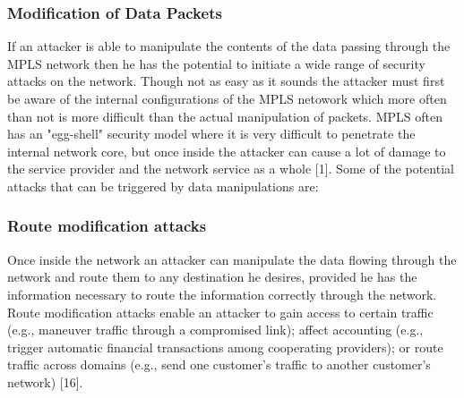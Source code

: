 \subsubsection{Modification of Data Packets}
If an attacker is able to manipulate the contents of the data passing through the MPLS network then he has the potential to initiate a wide range of security attacks on the network. Though not as easy as it sounds the attacker must first be aware of the internal configurations of the MPLS netowork which more often than not is more difficult than the actual manipulation of packets. MPLS often has an "egg-shell" security model where it is very difficult to penetrate the internal network core, but once inside the attacker can cause a lot of damage to the service provider and the network service as a whole [1]. Some of the potential attacks that can be triggered by data manipulations are:

\subsubsection{Route modification attacks}
Once inside the network an attacker can manipulate the data flowing through the network and route them to any destination he desires, provided he has the information necessary to route the information correctly through the network. Route modification attacks enable an attacker to gain access to certain traffic (e.g., maneuver traffic through a compromised link); affect accounting (e.g., trigger automatic financial transactions among cooperating providers); or route traffic across domains (e.g., send one customer’s traffic to another customer’s network) [16].


